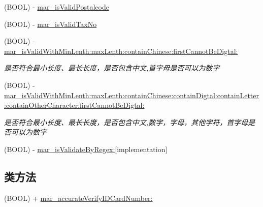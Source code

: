 \begin{DoxyCompactItemize}
\item 
(B\+O\+OL) -\/ \hyperlink{category_n_s_string_07_m_a_r_e_x___regex_08_a6afeb630cb43a12d246a25c73e2a209c}{mar\+\_\+is\+Valid\+Postalcode}
\item 
(B\+O\+OL) -\/ \hyperlink{category_n_s_string_07_m_a_r_e_x___regex_08_aa9ebdc5b33851c249387ec2ea2628da0}{mar\+\_\+is\+Valid\+Tax\+No}
\item 
(B\+O\+OL) -\/ \hyperlink{category_n_s_string_07_m_a_r_e_x___regex_08_ae374f282a2b8ba9cad5acca1b0b63fd0}{mar\+\_\+is\+Valid\+With\+Min\+Lenth\+:max\+Lenth\+:contain\+Chinese\+:first\+Cannot\+Be\+Digtal\+:}
\begin{DoxyCompactList}\small\item\em 是否符合最小长度、最长长度，是否包含中文,首字母是否可以为数字 \end{DoxyCompactList}\item 
(B\+O\+OL) -\/ \hyperlink{category_n_s_string_07_m_a_r_e_x___regex_08_ae94d6578a2ec839c9a692ed742468c73}{mar\+\_\+is\+Valid\+With\+Min\+Lenth\+:max\+Lenth\+:contain\+Chinese\+:contain\+Digtal\+:contain\+Letter\+:contain\+Other\+Character\+:first\+Cannot\+Be\+Digtal\+:}
\begin{DoxyCompactList}\small\item\em 是否符合最小长度、最长长度，是否包含中文,数字，字母，其他字符，首字母是否可以为数字 \end{DoxyCompactList}\item 
(B\+O\+OL) -\/ \hyperlink{category_n_s_string_07_m_a_r_e_x___regex_08_ab0be1de32ee3675c594bd556451a6a61}{mar\+\_\+is\+Validate\+By\+Regex\+:}{\ttfamily  \mbox{[}implementation\mbox{]}}
\end{DoxyCompactItemize}
\subsection*{类方法}
\begin{DoxyCompactItemize}
\item 
(B\+O\+OL) + \hyperlink{category_n_s_string_07_m_a_r_e_x___regex_08_aca8d105b0b7a38137d83b5e2fc650322}{mar\+\_\+accurate\+Verify\+I\+D\+Card\+Number\+:}
\end{DoxyCompactItemize}


